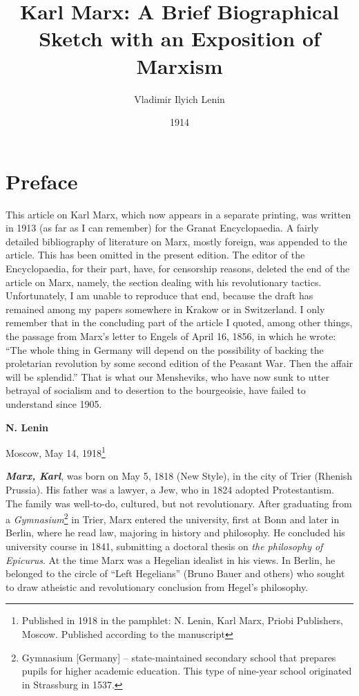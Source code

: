 \documentclass[a4paper,12pt]{book}
\title{Karl Marx: A Brief Biographical Sketch with an Exposition of Marxism}
\author{Vladimir Ilyich Lenin}
\date{1914}
\newcommand{\q}[1]{``#1''}
\begin{document}
\frontmatter
\maketitle
\chapter*{Preface}

This article on Karl Marx, which now appears in a separate printing, was written in 1913 (as far as I can remember) for the Granat Encyclopaedia. A fairly detailed bibliography of literature on Marx, mostly foreign, was appended to the article. This has been omitted in the present edition. The editor of the Encyclopaedia, for their part, have, for censorship reasons, deleted the end of the article on Marx, namely, the section dealing with his revolutionary tactics. Unfortunately, I am unable to reproduce that end, because the draft has remained among my papers somewhere in Krakow or in Switzerland. I only remember that in the concluding part of the article I quoted, among other things, the passage from Marx’s letter to Engels of April 16, 1856, in which he wrote: \q{The whole thing in Germany will depend on the possibility of backing the proletarian revolution by some second edition of the Peasant War. Then the affair will be splendid.} That is what our Mensheviks, who have now sunk to utter betrayal of socialism and to desertion to the bourgeoisie, have failed to understand since 1905.

\begin{flushright}
	\textbf{N. Lenin}

	Moscow, May 14, 1918\footnote{Published in 1918 in the pamphlet: N. Lenin, Karl Marx, Priobi Publishers, Moscow. Published according to the manuscript}
\end{flushright}




\mainmatter

\textbf{\emph{Marx, Karl}}, was born on May 5, 1818 (New Style), in the city of Trier (Rhenish Prussia). His father was a lawyer, a Jew, who in 1824 adopted Protestantism. The family was well-to-do, cultured, but not revolutionary. After graduating from a \emph{Gymnasium}\footnote{Gymnasium [Germany] -- state-maintained secondary school that prepares pupils for higher academic education. This type of nine-year school originated in Strassburg in 1537. } in Trier, Marx entered the university, first at Bonn and later in Berlin, where he read law, majoring in history and philosophy. He concluded his university course in 1841, submitting a doctoral thesis on \emph{the philosophy of Epicurus}. At the time Marx was a Hegelian idealist in his views. In Berlin, he belonged to the circle of \q{Left Hegelians} (Bruno Bauer and others) who sought to draw atheistic and revolutionary conclusion from Hegel’s philosophy.
\end{document}
